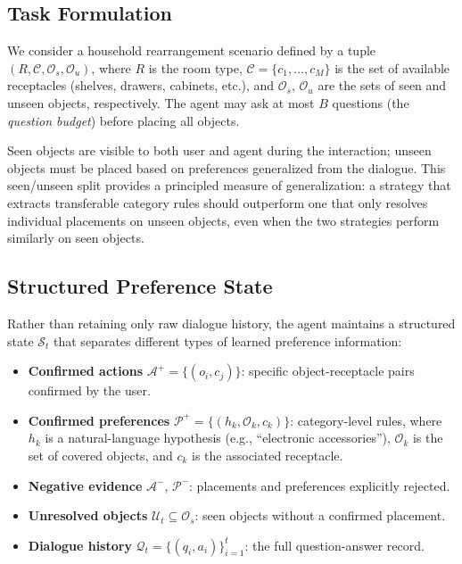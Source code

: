 \documentclass[a4paper,fleqn]{cas-sc}
\begin{document}
\subsection{Task Formulation}

We consider a household rearrangement scenario defined by a tuple $(R, \mathcal{C}, \mathcal{O}_s, \mathcal{O}_u)$, where $R$ is the room type, $\mathcal{C} = \{c_1, \dots, c_M\}$ is the set of available receptacles (shelves, drawers, cabinets, etc.), and $\mathcal{O}_s$, $\mathcal{O}_u$ are the sets of seen and unseen objects, respectively. The agent may ask at most $B$ questions (the \emph{question budget}) before placing all objects.

Seen objects are visible to both user and agent during the interaction; unseen objects must be placed based on preferences generalized from the dialogue. This seen/unseen split provides a principled measure of generalization: a strategy that extracts transferable category rules should outperform one that only resolves individual placements on unseen objects, even when the two strategies perform similarly on seen objects.

\subsection{Structured Preference State}

Rather than retaining only raw dialogue history, the agent maintains a structured state $\mathcal{S}_t$ that separates different types of learned preference information:

\begin{itemize}[leftmargin=*]
    \item \textbf{Confirmed actions} $\mathcal{A}^+ = \{(o_i, c_j)\}$: specific object-receptacle pairs confirmed by the user.
    \item \textbf{Confirmed preferences} $\mathcal{P}^+ = \{(h_k, \mathcal{O}_k, c_k)\}$: category-level rules, where $h_k$ is a natural-language hypothesis (e.g., ``electronic accessories''), $\mathcal{O}_k$ is the set of covered objects, and $c_k$ is the associated receptacle.
    \item \textbf{Negative evidence} $\mathcal{A}^-$, $\mathcal{P}^-$: placements and preferences explicitly rejected.
    \item \textbf{Unresolved objects} $\mathcal{U}_t \subseteq \mathcal{O}_s$: seen objects without a confirmed placement.
    \item \textbf{Dialogue history} $\mathcal{Q}_t = \{(q_i, a_i)\}_{i=1}^{t}$: the full question-answer record.
\end{itemize}
\end{document}
